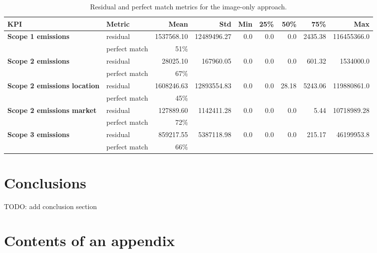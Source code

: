 \documentclass[english, 12pt, a4paper, elec, utf8, a-2b, online]{aaltothesis}
\newcommand{\ra}[1]{\renewcommand{\arraystretch}{#1}}
\begin{document}
\begin{table}\centering
    \ra{1.3}
    \begin{tabular}{@{}llrrrrrrr@{}}\toprule
        \textbf{KPI} & \textbf{Metric} & \textbf{Mean} & \textbf{Std} & \textbf{Min} & \textbf{25\%} & \textbf{50\%} & \textbf{75\%} & \textbf{Max} \\ \midrule
        \textbf{Scope 1 emissions} & residual & 1537568.10 & 12489496.27 & 0.0 & 0.0 & 0.0 & 2435.38 & 116455366.0 \\
        & perfect match & 51\% & & & & & & \\
        \textbf{Scope 2 emissions} & residual & 28025.10 & 167960.05 & 0.0 & 0.0 & 0.0 & 601.32 & 1534000.0 \\
        & perfect match & 67\% & & & & & & \\
        \textbf{Scope 2 emissions location} & residual & 1608246.63 & 12893554.83 & 0.0 & 0.0 & 28.18 & 5243.06 & 119880861.0 \\
        & perfect match & 45\% & & & & & & \\
        \textbf{Scope 2 emissions market} & residual & 127889.60 & 1142411.28 & 0.0 & 0.0 & 0.0 & 5.44 & 10718989.28 \\
        & perfect match & 72\% & & & & & & \\
        \textbf{Scope 3 emissions} & residual & 859217.55 & 5387118.98 & 0.0 & 0.0 & 0.0 & 215.17 & 46199953.8 \\
        & perfect match & 66\% & & & & & & \\
        \bottomrule
    \end{tabular}
    \caption{Residual and perfect match metrics for the image-only approach.}
    \label{tab:image_only_metrics}
\end{table}


\clearpage

\section{Conclusions}
\label{sec:summary}

TODO: add conclusion section


\clearpage
\thesisbibliography




\clearpage

\thesisappendix

\section{Contents of an appendix}
\label{app:contents}
\end{document}
